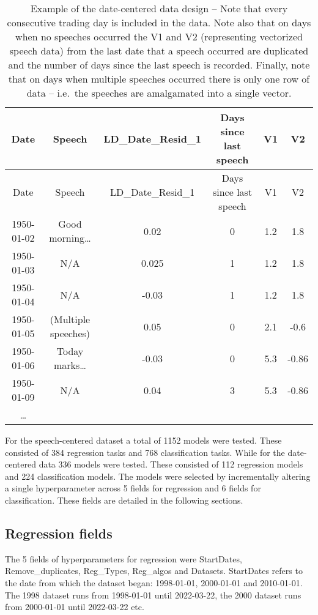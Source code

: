 \documentclass[11pt,preprint, authoryear]{elsarticle}
\numberwithin{equation}{section}
\numberwithin{figure}{section}
\numberwithin{table}{section}
\begin{document}
\begin{longtable}[]{@{}cccccc@{}}
\caption{Example of the date-centered data design -- Note that every
consecutive trading day is included in the data. Note also that on days
when no speeches occurred the V1 and V2 (representing vectorized speech
data) from the last date that a speech occurred are duplicated and the
number of days since the last speech is recorded. Finally, note that on
days when multiple speeches occurred there is only one row of data --
i.e.~the speeches are amalgamated into a single vector.}\tabularnewline
\toprule
Date & Speech & LD\_Date\_Resid\_1 & Days since last speech & V1 & V2 \\
\midrule
\endfirsthead
\toprule
Date & Speech & LD\_Date\_Resid\_1 & Days since last speech & V1 & V2 \\
\midrule
\endhead
1950-01-02 & Good morning\ldots{} & 0.02 & 0 & 1.2 & 1.8 \\
1950-01-03 & N/A & 0.025 & 1 & 1.2 & 1.8 \\
1950-01-04 & N/A & -0.03 & 1 & 1.2 & 1.8 \\
1950-01-05 & (Multiple speeches) & 0.05 & 0 & 2.1 & -0.6 \\
1950-01-06 & Today marks\ldots{} & -0.03 & 0 & 5.3 & -0.86 \\
1950-01-09 & N/A & 0.04 & 3 & 5.3 & -0.86 \\
\ldots{} & & & & & \\
\bottomrule
\end{longtable}

For the speech-centered dataset a total of 1152 models were tested.
These consisted of 384 regression tasks and 768 classification tasks.
While for the date-centered data 336 models were tested. These consisted
of 112 regression models and 224 classification models. The models were
selected by incrementally altering a single hyperparameter across 5
fields for regression and 6 fields for classification. These fields are
detailed in the following sections.

\hypertarget{regression-fields}{%
\subsection{Regression fields}\label{regression-fields}}

The 5 fields of hyperparameters for regression were StartDates,
Remove\_duplicates, Reg\_Types, Reg\_algos and Datasets. StartDates
refers to the date from which the dataset began: 1998-01-01, 2000-01-01
and 2010-01-01. The 1998 dataset runs from 1998-01-01 until 2022-03-22,
the 2000 dataset runs from 2000-01-01 until 2022-03-22 etc.
\end{document}
